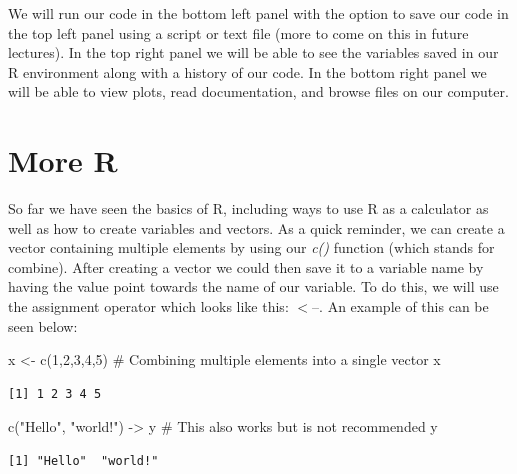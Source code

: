 \documentclass[
  letterpaper,
  DIV=11,
  numbers=noendperiod]{scrreprt}
\newenvironment{Shaded}{\begin{snugshade}}{\end{snugshade}}
\newcommand{\CommentTok}[1]{\textcolor[rgb]{0.37,0.37,0.37}{#1}}
\newcommand{\DecValTok}[1]{\textcolor[rgb]{0.68,0.00,0.00}{#1}}
\newcommand{\FunctionTok}[1]{\textcolor[rgb]{0.28,0.35,0.67}{#1}}
\newcommand{\NormalTok}[1]{\textcolor[rgb]{0.00,0.23,0.31}{#1}}
\newcommand{\OtherTok}[1]{\textcolor[rgb]{0.00,0.23,0.31}{#1}}
\newcommand{\StringTok}[1]{\textcolor[rgb]{0.13,0.47,0.30}{#1}}
\begin{document}
We will run our code in the bottom left panel with the option to save
our code in the top left panel using a script or text file (more to come
on this in future lectures). In the top right panel we will be able to
see the variables saved in our R environment along with a history of our
code. In the bottom right panel we will be able to view plots, read
documentation, and browse files on our computer.


\chapter{More R}\label{more-r}

So far we have seen the basics of R, including ways to use R as a
calculator as well as how to create variables and vectors. As a quick
reminder, we can create a vector containing multiple elements by using
our \emph{c()} function (which stands for combine). After creating a
vector we could then save it to a variable name by having the value
point towards the name of our variable. To do this, we will use the
assignment operator which looks like this: \(<\)--. An example of this
can be seen below:

\begin{Shaded}
\begin{Highlighting}[]
\NormalTok{x }\OtherTok{\textless{}{-}} \FunctionTok{c}\NormalTok{(}\DecValTok{1}\NormalTok{,}\DecValTok{2}\NormalTok{,}\DecValTok{3}\NormalTok{,}\DecValTok{4}\NormalTok{,}\DecValTok{5}\NormalTok{) }\CommentTok{\# Combining multiple elements into a single vector }
\NormalTok{x}
\end{Highlighting}
\end{Shaded}

\begin{verbatim}
[1] 1 2 3 4 5
\end{verbatim}

\begin{Shaded}
\begin{Highlighting}[]
\FunctionTok{c}\NormalTok{(}\StringTok{"Hello"}\NormalTok{, }\StringTok{"world!"}\NormalTok{) }\OtherTok{{-}\textgreater{}}\NormalTok{ y }\CommentTok{\# This also works but is not recommended}
\NormalTok{y}
\end{Highlighting}
\end{Shaded}

\begin{verbatim}
[1] "Hello"  "world!"
\end{verbatim}
\end{document}
